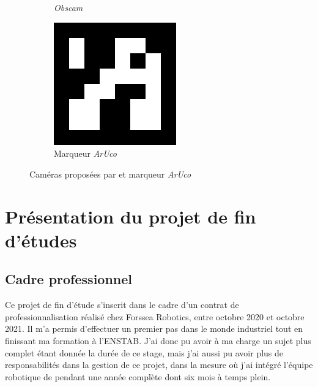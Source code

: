 \begin{figure}[!htb]
\begin{subfigure}[t]{0.33\textwidth}
					\caption{\textit{Obscam}}
					\label{fig:obscam}
				\end{subfigure}
				\hfill
				\begin{subfigure}[t]{0.25\textwidth}
					\centering
					\includegraphics[width=\textwidth]{imgs/aruco.png}
					\caption{Marqueur \textit{ArUco}}
					\label{fig:aruco}
				\end{subfigure}
				\hfill
				\caption{Caméras proposées par \forssea{} et marqueur \textit{ArUco}}
				\label{fig:Cameras}
			\end{figure}

	\section[Projet de fin d'études]{Présentation du projet de fin d'études}

		\subsection{Cadre professionnel}

			Ce projet de fin d'étude s'inscrit dans le cadre d'un contrat de professionnalisation réalisé chez Forssea Robotics, entre octobre 2020 et octobre 2021. Il m'a permis d'effectuer un premier pas dans le monde industriel tout en finissant ma formation à l'\gls{ENSTAB}. J'ai donc pu avoir à ma charge un sujet plus complet étant donnée la durée de ce stage, mais j'ai aussi pu avoir plus de responsabilités dans la gestion de ce projet, dans la mesure où j'ai intégré l'équipe robotique de \forssea{} pendant une année complète dont six mois à temps plein.

